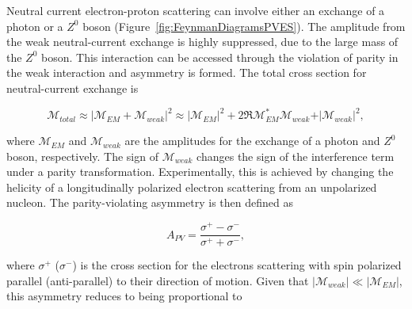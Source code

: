 %

Neutral current electron-proton scattering can involve either an exchange of a photon or a $Z^{0}$ boson (Figure~\ref{fig:FeynmanDiagramsPVES}). 
The amplitude from the weak neutral-current exchange is highly suppressed, due to the large mass of the $Z^{0}$ boson. This interaction can be accessed through the violation of parity in the weak interaction and asymmetry is formed. The total cross section for neutral-current exchange is


\begin{equation} \label{equ:qweak1}
\mathcal{M}_{total} \approx \vert \mathcal{M}_{EM} + \mathcal{M}_{weak} \vert^{2} \approx \vert \mathcal{M}_{EM} \vert^{2} + 2 \Re \mathcal{M}_{EM}^{*}\mathcal{M}_{weak} + \vert \mathcal{M}_{weak} \vert^{2}, 
\end{equation}

\noindent
where $\mathcal{M}_{EM}$ and $\mathcal{M}_{weak}$ are the amplitudes for the exchange of a photon and $Z^{0}$ boson, respectively. 
The sign of $\mathcal{M}_{weak}$ changes the sign of the interference term under a parity transformation. Experimentally, this is achieved by changing the helicity of a longitudinally polarized electron scattering from an unpolarized nucleon. The parity-violating asymmetry is then defined as

\begin{equation} \label{equ:qweak2}
A_{PV} = \frac{\sigma^{+} - \sigma^{-} }{\sigma^{+} + \sigma^{-}},
\end{equation}

\noindent
where $\sigma^{+}$ ($\sigma^{-}$)
is the cross section for the electrons scattering with spin polarized parallel (anti-parallel) to their direction of motion.
Given that $\vert \mathcal{M}_{weak} \vert \ll \vert \mathcal{M}_{EM} \vert$, this asymmetry reduces to being proportional to

